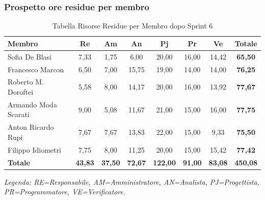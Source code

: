 \subsubsection{Prospetto ore residue per membro}
\begin{table}[H]
    \centering
    \renewcommand{\arraystretch}{1.3}
    \begin{tabularx}{\textwidth}{|X|c|c|c|c|c|c|c|}
        \hline
        \textbf{Membro} & \textbf{Re} & \textbf{Am} & \textbf{An} &
        \textbf{Pj} & \textbf{Pr} & \textbf{Ve} & \textbf{Totale} \\
        \hline
        Sofia De Blasi           &  7,33 &  1,75 &  6,00 & 20,00 & 16,00 & 14,42 & \textbf{65,50} \\
        Francesco Marcon         &  6,50 &  7,00 & 15,75 & 19,00 & 14,00 & 14,00 & \textbf{76,25} \\
        Roberto M. Doroftei      &  5,58 &  8,00 & 14,17 & 20,00 & 16,00 & 13,92 & \textbf{77,67} \\
        Armando Moda Scarati     &  9,00 &  5,08 & 11,67 & 21,00 & 15,00 & 16,00 & \textbf{77,75} \\
        Anton Ricardo Rupi       &  7,67 &  7,67 & 13,83 & 22,00 & 15,00 &  9,33 & \textbf{75,50} \\
        Filippo Idiometri        &  7,75 &  8,00 & 11,25 & 20,00 & 15,00 & 15,42 & \textbf{77,42} \\
        \hline
        \textbf{Totale} &
        \textbf{43,83} & \textbf{37,50} & \textbf{72,67} &
        \textbf{122,00} & \textbf{91,00} & \textbf{83,08} &
        \textbf{450,08} \\
        \hline
    \end{tabularx}
    \begin{minipage}{\textwidth}
        \smallskip
        \footnotesize\textit{Legenda: RE=Responsabile, AM=Amministratore,
        AN=Analista, PJ=Progettista, PR=Programmatore, VE=Verificatore.}
    \end{minipage}
    \caption{Tabella Risorse Residue per Membro dopo Sprint 6}
\end{table}

